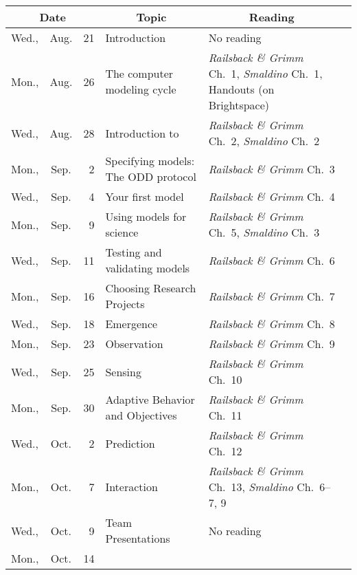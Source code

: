 \documentclass[11pt,twoside]{jgsyllabus}\usepackage[]{graphicx}\usepackage[]{xcolor}
\begin{document}
\begin{center}
\begin{tabular}{l@{~}c@{~}r>{\raggedright}m{2.6in}>{\centering}m{2in}c}
  \toprule
  \multicolumn{3}{c}{\bfseries Date} & \multicolumn{1}{c}{\bfseries Topic} &\multicolumn{1}{c}{\bfseries Reading} &\\
 \midrule
Wed., & Aug. &  21 & Introduction & No reading &  \\ 
   \midrule
Mon., & Aug. &  26 & The computer modeling cycle & \emph{Railsback \& Grimm\/} Ch.~1, \emph{Smaldino\/} Ch.~1, Handouts (on Brightspace) &  \\ 
   \midrule
Wed., & Aug. &  28 & Introduction to \NetLogo{} & \emph{Railsback \& Grimm\/} Ch.~2, \emph{Smaldino\/} Ch.~2 &  \\ 
   \midrule
Mon., & Sep. &   2 & Specifying models: The ODD protocol & \emph{Railsback \& Grimm\/} Ch.~3 &  \\ 
   \midrule
Wed., & Sep. &   4 & Your first model & \emph{Railsback \& Grimm\/} Ch.~4 &  \\ 
   \midrule
Mon., & Sep. &   9 & Using models for science & \emph{Railsback \& Grimm\/} Ch.~5, \emph{Smaldino\/} Ch.~3 &  \\ 
   \midrule
Wed., & Sep. &  11 & Testing and validating models & \emph{Railsback \& Grimm\/} Ch.~6 &  \\ 
   \midrule
Mon., & Sep. &  16 & Choosing Research Projects & \emph{Railsback \& Grimm\/} Ch.~7 &  \\ 
   \midrule
Wed., & Sep. &  18 & Emergence & \emph{Railsback \& Grimm\/} Ch.~8 &  \\ 
   \midrule
Mon., & Sep. &  23 & Observation & \emph{Railsback \& Grimm\/} Ch.~9 &  \\ 
   \midrule
Wed., & Sep. &  25 & Sensing & \emph{Railsback \& Grimm\/} Ch.~10 &  \\ 
   \midrule
Mon., & Sep. &  30 & Adaptive Behavior and Objectives & \emph{Railsback \& Grimm\/} Ch.~11 &  \\ 
   \midrule
Wed., & Oct. &   2 & Prediction & \emph{Railsback \& Grimm\/} Ch.~12 &  \\ 
   \midrule
Mon., & Oct. &   7 & Interaction & \emph{Railsback \& Grimm\/} Ch.~13, \emph{Smaldino\/} Ch.~6--7, 9 &  \\ 
   \midrule
Wed., & Oct. &   9 & Team Presentations & No reading &  \\ 
   \midrule
Mon., & Oct. &  14 & \multicolumn{2}{l}{\bfseries\scshape\large Fall Break} & \\%

\end{tabular}
\end{center}
\end{document}
